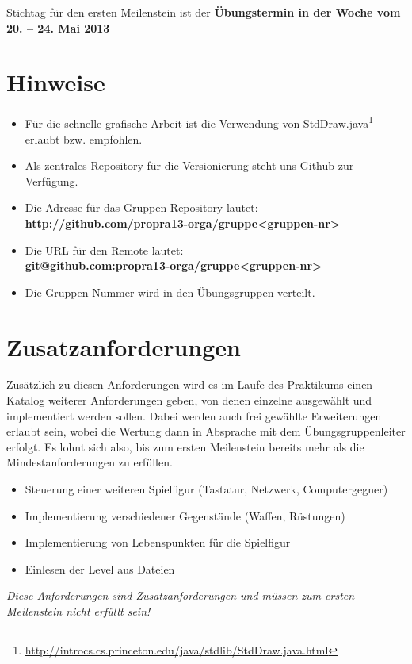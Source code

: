 \documentclass{programmierpraktikum}
\begin{document}
Stichtag für den ersten Meilenstein ist der \textbf{Übungstermin in der Woche vom 20. -- 24. Mai 2013}
%
\section{Hinweise}
\begin{itemize}
  \item Für die schnelle grafische Arbeit ist die Verwendung von
    StdDraw.java\footnote{\url{http://introcs.cs.princeton.edu/java/stdlib/StdDraw.java.html}} erlaubt
    bzw. empfohlen.
  \item Als zentrales Repository für die Versionierung steht uns Github zur Verfügung.
  \item Die Adresse für das Gruppen-Repository lautet:\\
    \textbf{http://github.com/propra13-orga/gruppe<gruppen-nr>}
  \item Die URL für den Remote lautet:\\
    \textbf{git@github.com:propra13-orga/gruppe<gruppen-nr>}
  \item Die Gruppen-Nummer wird in den Übungsgruppen verteilt.
\end{itemize}
\newpage
\section{Zusatzanforderungen}
Zusätzlich zu diesen Anforderungen wird es im Laufe des Praktikums einen Katalog weiterer
Anforderungen geben, von denen einzelne ausgewählt und implementiert werden sollen. Dabei werden
auch frei gewählte Erweiterungen erlaubt sein, wobei die Wertung dann in Absprache mit dem
Übungsgruppenleiter erfolgt. Es lohnt sich also, bis zum ersten Meilenstein bereits mehr als die
Mindestanforderungen zu erfüllen.
\begin{itemize}
  \item Steuerung einer weiteren Spielfigur (Tastatur, Netzwerk, Computergegner)
  \item Implementierung verschiedener Gegenstände (Waffen, Rüstungen)
  \item Implementierung von Lebenspunkten für die Spielfigur
  \item Einlesen der Level aus Dateien
\end{itemize}
\emph{Diese Anforderungen sind Zusatzanforderungen und müssen zum ersten Meilenstein nicht erfüllt sein!}
%
\end{document}
